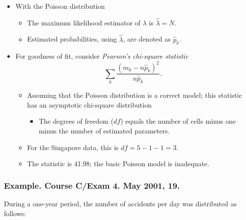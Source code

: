 \documentclass[]{book}
\providecommand{\tightlist}{%
  \setlength{\itemsep}{0pt}\setlength{\parskip}{0pt}}
\theoremstyle{definition}
\theoremstyle{definition}
\theoremstyle{definition}
\theoremstyle{remark}
\begin{document}
\begin{itemize}
\item
  With the Poisson distribution

  \begin{itemize}
  \item
    The maximum likelihood estimator of \(\lambda\) is
    \(\widehat{\lambda}=\overline{N}\).
  \item
    Estimated probabilities, using \(\widehat{\lambda}\), are denoted as
    \(\widehat{p}_k\).
  \end{itemize}
\item
  For goodness of fit, consider \emph{Pearson's chi-square statistic}
  \[\sum_k\frac{\left( m_k-n\widehat{p}_k \right) ^{2}}{n\widehat{p}_k}.\]

  \begin{itemize}
  \item
    Assuming that the Poisson distribution is a correct model; this
    statistic has an asymptotic chi-square distribution

    \begin{itemize}
    \tightlist
    \item
      The degrees of freedom (\(df\)) equals the number of cells minus
      one minus the number of estimated parameters.
    \end{itemize}
  \item
    For the Singapore data, this is \(df=5-1-1=3\).
  \item
    The statistic is 41.98; the basic Poisson model is inadequate.
  \end{itemize}
\end{itemize}

\subsubsection{Example. Course C/Exam 4. May 2001,
19.}\label{example.-course-cexam-4.-may-2001-19.}

During a one-year period, the number of accidents per day was
distributed as follows:
\end{document}
